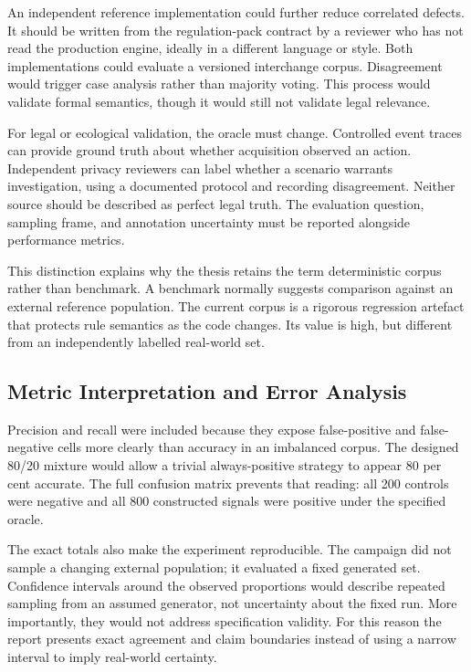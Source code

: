 An independent reference implementation could further reduce correlated defects. It should be written from the regulation-pack contract by a reviewer who has not read the production engine, ideally in a different language or style. Both implementations could evaluate a versioned interchange corpus. Disagreement would trigger case analysis rather than majority voting. This process would validate formal semantics, though it would still not validate legal relevance.

For legal or ecological validation, the oracle must change. Controlled event traces can provide ground truth about whether acquisition observed an action. Independent privacy reviewers can label whether a scenario warrants investigation, using a documented protocol and recording disagreement. Neither source should be described as perfect legal truth. The evaluation question, sampling frame, and annotation uncertainty must be reported alongside performance metrics.

This distinction explains why the thesis retains the term deterministic corpus rather than benchmark. A benchmark normally suggests comparison against an external reference population. The current corpus is a rigorous regression artefact that protects rule semantics as the code changes. Its value is high, but different from an independently labelled real-world set.

\subsection{Metric Interpretation and Error Analysis}

Precision and recall were included because they expose false-positive and false-negative cells more clearly than accuracy in an imbalanced corpus. The designed 80/20 mixture would allow a trivial always-positive strategy to appear 80 per cent accurate. The full confusion matrix prevents that reading: all 200 controls were negative and all 800 constructed signals were positive under the specified oracle.

The exact totals also make the experiment reproducible. The campaign did not sample a changing external population; it evaluated a fixed generated set. Confidence intervals around the observed proportions would describe repeated sampling from an assumed generator, not uncertainty about the fixed run. More importantly, they would not address specification validity. For this reason the report presents exact agreement and claim boundaries instead of using a narrow interval to imply real-world certainty.

